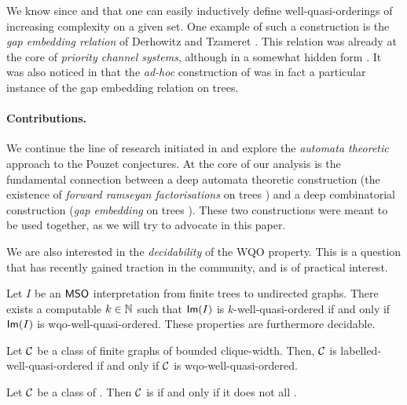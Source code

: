 We know since \cite{FREU20} and \cite{LOPEZ23} that one can easily inductively
define well-quasi-orderings of increasing complexity on a given set. One
example of such a construction is the \emph{gap embedding relation} of
Derhowitz and Tzameret \cite{DERSHOWITZ200380}. This relation was already at
the core of \emph{priority channel systems}, although in a somewhat hidden form
\cite{HSS13}.  It was also noticed in \cite{LOPEZ24} that the \emph{ad-hoc}
construction of \cite{DRT10} was in fact a particular instance of the gap
embedding relation on trees.

\paragraph*{Contributions.} We continue the line of research initiated in
\cite{LOPEZ24} and explore the \emph{automata theoretic} approach to the Pouzet
conjectures. At the core of our analysis is the fundamental connection between
a deep automata theoretic construction (the existence of \emph{forward ramseyan
factorisations} on trees \cite{COLC07}) and a deep combinatorial construction
(\emph{gap embedding} on trees \cite{DERSHOWITZ200380}). These two
constructions were meant to be used together, as we will try to advocate in
this paper.

We are also interested in the \emph{decidability} of the WQO property. This is
a question that has recently gained traction in the community, and is of
practical interest.

\begin{theorem}[restate=effective-image:thm,label={effective-image:thm}]
    \label{effective-image:thm}
    Let $I$ be an $\mathsf{MSO}$ interpretation
    from finite trees to undirected graphs.
    There exists a computable $k \in \mathbb{N}$
    such that $\mathsf{Im}(I)$
    is $k$-well-quasi-ordered
    if and only if 
    $\mathsf{Im}(I)$ is wqo-well-quasi-ordered.
    These properties are furthermore decidable.
\end{theorem}

\begin{theorem}[restate=pouzet2:thm]
    \label{pouzet-2:thm}
    Let $\mathcal{C}$ be a class of finite graphs of bounded clique-width.
    Then, $\mathcal{C}$ is labelled-well-quasi-ordered
    if and only if 
    $\mathcal{C}$ is wqo-well-quasi-ordered.
\end{theorem}

\begin{theorem}[restate=transductions-paths:thm,label={transductions-paths:thm}]
    \label{transductions-paths:thm}
    Let $\mathcal{C}$ be a class of .
    Then $\mathcal{C}$ is 
    if and only if
    it does not 
    all .
\end{theorem}

